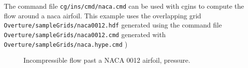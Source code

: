 \documentclass{article}
\newcommand{\Index}[1]{#1\index{#1}}
\begin{document}
The command file {\tt cg/ins/cmd/naca.cmd} can be used with cgins to compute the
flow around a naca airfoil.
This example uses the overlapping grid {\tt Overture/\-sampleGrids/\-naca0012.hdf}  generated
using the command file {\tt Overture/\-sampleGrids/\-naca0012.cmd} 
generated with {\tt Overture/\-sampleGrids/\-naca.hype.cmd} )

{
\begin{figure}[hbt]
\newcommand{\figWidtha}{9.5cm}
\newcommand{\trimfiga}[2]{\trimPlot{#1}{#2}{.118}{.13}{.24}{.22}}
\begin{center}
\end{center} 
\caption{Incompressible flow past a NACA 0012 airfoil, pressure.}
\label{fig:naca}
\end{figure}
}



\end{document}
